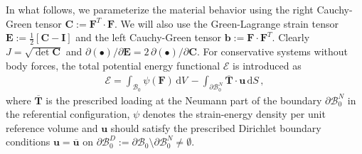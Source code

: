 \documentclass[AMA,STIX1COL]{WileyNJD-v2}
\newcommand*{\gz}[1]{\boldsymbol{#1}}
\renewcommand*{\d}{\mathrm{d}}
\newcommand*{\mcl}[1]{\mathcal{#1}}
\begin{document}
In what follows, we parameterize the material behavior using the right Cauchy-Green tensor $\gz C := \gz F^T \cdot \gz F$.
We will also use the Green-Lagrange strain tensor $\gz E:=\frac{1}{2}\left[\gz C - \gz I\right]$ and the left Cauchy-Green tensor $\gz b := \gz F \cdot \gz F^T$.
Clearly $J = \sqrt{\det \gz C}$ and $\partial (\bullet)/\partial \gz E = 2\, \partial (\bullet)/\partial \gz C$.
%
For conservative systems without body forces, the total potential energy functional $\mcl E$ is introduced as
\begin{align}
\mcl E =
\int_{\mcl B_0} \psi(\gz F) \, \d V \,
- \int_{\partial \mcl B_0^N} \overline{\gz T} \cdot \gz u \, \d S \, ,
\end{align}
where $\overline{\gz T}$ is the prescribed loading at the Neumann part of the boundary $\partial \mcl B_0^N$ in the referential configuration,
$\psi$ denotes the strain-energy density per unit reference volume and $\gz u$ should satisfy the prescribed Dirichlet boundary
conditions $\gz u = \overline{\gz u}$ on $\partial \mcl B_0^D := \partial \mcl B_0 \setminus \partial \mcl B_0^N \neq \emptyset $.
\end{document}
